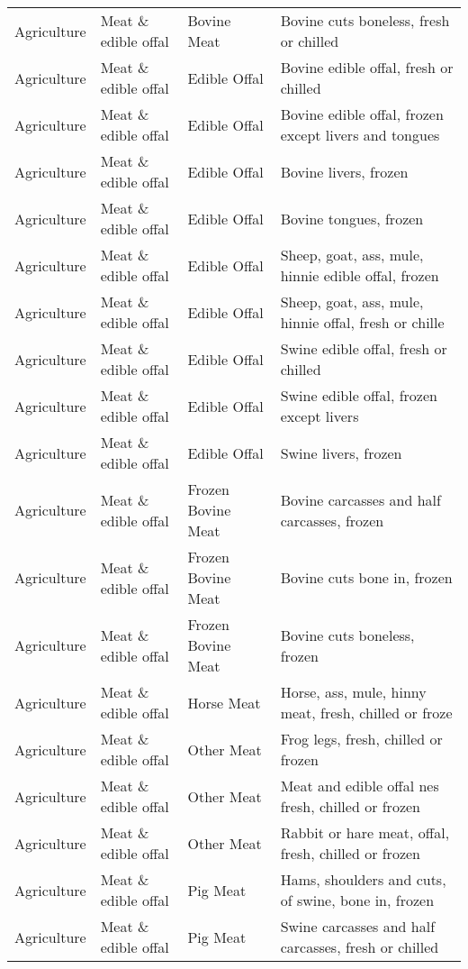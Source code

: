 \begin{appendices}
\begin{xltabular}{\textwidth}{|p{0.07\textwidth}|p{0.28\textwidth}|p{0.24\textwidth}|p{0.31\textwidth}|}
	Agriculture & Meat \& edible offal & Bovine Meat & Bovine cuts boneless, fresh or chilled \\
	Agriculture & Meat \& edible offal & Edible Offal & Bovine edible offal, fresh or chilled \\
	Agriculture & Meat \& edible offal & Edible Offal & Bovine edible offal, frozen except livers and tongues \\
	Agriculture & Meat \& edible offal & Edible Offal & Bovine livers, frozen \\
	Agriculture & Meat \& edible offal & Edible Offal & Bovine tongues, frozen \\
	Agriculture & Meat \& edible offal & Edible Offal & Sheep, goat, ass, mule, hinnie edible offal, frozen \\
	Agriculture & Meat \& edible offal & Edible Offal & Sheep, goat, ass, mule, hinnie offal, fresh or chille \\
	Agriculture & Meat \& edible offal & Edible Offal & Swine edible offal, fresh or chilled \\
	Agriculture & Meat \& edible offal & Edible Offal & Swine edible offal, frozen except livers \\
	Agriculture & Meat \& edible offal & Edible Offal & Swine livers, frozen \\
	Agriculture & Meat \& edible offal & Frozen Bovine Meat & Bovine carcasses and half carcasses, frozen \\
	Agriculture & Meat \& edible offal & Frozen Bovine Meat & Bovine cuts bone in, frozen \\
	Agriculture & Meat \& edible offal & Frozen Bovine Meat & Bovine cuts boneless, frozen \\
	Agriculture & Meat \& edible offal & Horse Meat & Horse, ass, mule, hinny meat, fresh, chilled or froze \\
	Agriculture & Meat \& edible offal & Other Meat & Frog legs, fresh, chilled or frozen \\
	Agriculture & Meat \& edible offal & Other Meat & Meat and edible offal nes fresh, chilled or frozen \\
	Agriculture & Meat \& edible offal & Other Meat & Rabbit or hare meat, offal, fresh, chilled or frozen \\
	Agriculture & Meat \& edible offal & Pig Meat & Hams, shoulders and cuts, of swine, bone in, frozen \\
	Agriculture & Meat \& edible offal & Pig Meat & Swine carcasses and half carcasses, fresh or chilled \\

\end{xltabular}
\end{appendices}
